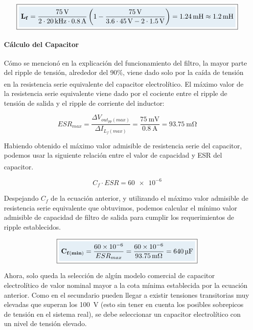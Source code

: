 \begin{equation}\label{Lf_valor}
    \boxed{
    \highlight{\mathbf{L_f} = \frac{\SI{75}{\volt}}{2\cdot\SI{20}{\kilo\hertz}\cdot\SI{0.8}{\ampere}}\left(1-\frac{\SI{75}{\volt}}{\num{3.6}\cdot\SI{45}{\volt}-2\cdot\SI{1.5}{\volt}}\right) = \SI{1.24}{\milli\henry} \approx \SI{1.2}{\milli\henry}}
    }
\end{equation}

\paragraph{Cálculo del Capacitor}

Cómo se mencionó en la explicación del funcionamiento del filtro, la mayor parte del ripple de tensión, alrededor del 90\%, viene dado solo por la caída de tensión en la resistencia serie equivalente del capacitor electrolítico.\textsuperscript{\cite{SoftSwitchPWM}} El máximo valor de la resistencia serie equivalente viene dado por el cociente entre el ripple de tensión de salida y el ripple de corriente del inductor:

\begin{equation*}
    ESR_{max} = \frac{\Delta V_{out_{pp}(max)}}{\Delta I_{L_f(max)}} = \frac{\SI{75}{\milli\volt}}{\SI{0.8}{\ampere}} = \SI{93.75}{\milli\ohm}
\end{equation*}

Habiendo obtenido el máximo valor admisible de resistencia serie del capacitor, podemos usar la siguiente relación entre el valor de capacidad y ESR del capacitor.\textsuperscript{\cite{SoftSwitchPWM}}

\begin{equation}\label{Cf-ESR}
    C_f\cdot ESR = \num{60e-6}
\end{equation}

Despejando $C_f$ de la ecuación anterior, y utilizando el máximo valor admisible de resistencia serie equivalente que obtuvimos, podemos calcular el mínimo valor admisible de capacidad de filtro de salida para cumplir los requerimientos de ripple establecidos.

\begin{equation}\label{Cf_valor}
    \boxed{
    \highlight{\mathbf{C_{f(min)}} = \frac{\num{60e-6}}{ESR_{max}} = \frac{\num{60e-6}}{\SI{93.75}{\milli\ohm}} = \SI{640}{\micro\farad}}
    }
\end{equation}

Ahora, solo queda la selección de algún modelo comercial de capacitor electrolítico de valor nominal mayor a la cota mínima establecida por la ecuación anterior. Como en el secundario pueden llegar a existir tensiones transitorias muy elevadas que superan los \SI{100}{\volt} (esto sin tener en cuenta los posibles sobrepicos de tensión en el sistema real), se debe seleccionar un capacitor electrolítico con un nivel de tensión elevado.\\

